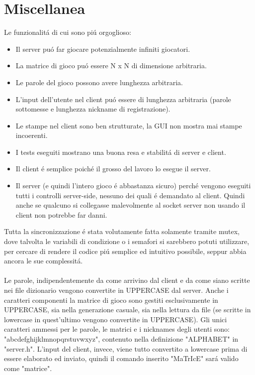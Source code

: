 \chapter{Miscellanea}

Le funzionalit\'a di cui sono pi\'u orgoglioso:
\begin{itemize}
\item Il server pu\'o far giocare potenzialmente infiniti giocatori.
\item La matrice di gioco pu\'o essere N x N di dimensione arbitraria.
\item Le parole del gioco possono avere lunghezza arbitraria.
\item L'input dell'utente nel client pu\'o essere di lunghezza arbitraria (parole sottomesse e lunghezza nickname di registrazione).
\item Le stampe nel client sono ben strutturate, la GUI non mostra mai stampe incoerenti.
\item I tests eseguiti mostrano una buona resa e stabilit\'a di server e client.
\item Il client \'e semplice poich\'e il grosso del lavoro lo esegue il server.
\item Il server (e quindi l'intero gioco \'e abbastanza sicuro) perch\'e vengono eseguiti tutti i controlli server-side, nessuno dei quali \'e demandato al client. Quindi anche se qualcuno si collegasse malevolmente al socket server non usando il client non potrebbe far danni.
\end{itemize}
\leavevmode 
Tutta la sincronizzazione \'e stata volutamente fatta solamente tramite mutex, dove talvolta le variabili di condizione o i semafori si sarebbero potuti utilizzare, per cercare di rendere il codice pi\'u semplice ed intuitivo possibile, seppur abbia ancora le sue complessit\'a.
\\
 \\
 Le parole, indipendentemente da come arrivino dal client e da come siano scritte nei file dizionario vengono convertite in UPPERCASE dal server. Anche i caratteri componenti la matrice di gioco sono gestiti esclusivamente in UPPERCASE, sia nella generazione casuale, sia nella lettura da file (se scritte in lowercase in quest'ultimo vengono convertite in UPPERCASE). Gli unici caratteri ammessi per le parole, le matrici e i nicknames degli utenti sono: "abcdefghijklmnopqrstuvwxyz", contenuto nella definizione "ALPHABET" in "server.h". L'input del client, invece, viene tutto convertito a lowercase prima di essere elaborato ed inviato, quindi il comando inserito "MaTrIcE" sar\'a valido come "matrice".
